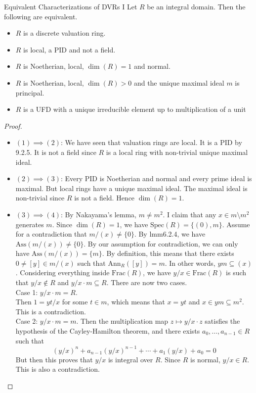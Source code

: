 \documentclass[a4paper]{article}
\begin{document}
\begin{prp}{Equivalent Characterizations of DVRs I}{} Let $R$ be an integral domain. Then the following are equivalent. 
\begin{itemize}
\item $R$ is a discrete valuation ring. 
\item $R$ is local, a PID and not a field. 
\item $R$ is Noetherian, local, $\dim(R)=1$ and normal. 
\item $R$ is Noetherian, local, $\dim(R)>0$ and the unique maximal ideal $m$ is principal. 
\item $R$ is a UFD with a unique irreducible element up to multiplication of a unit
\end{itemize} 
\begin{proof}\\
\begin{itemize}
\item $(1)\implies(2)$: We have seen that valuation rings are local. It is a PID by 9.2.5. It is not a field since $R$ is a local ring with non-trivial unique maximal ideal. 
\item $(2)\implies(3)$: Every PID is Noetherian and normal and every prime ideal is maximal. But local rings have a unique maximal ideal. The maximal ideal is non-trivial since $R$ is not a field. Hence $\dim(R)=1$. 
\item $(3)\implies(4)$: By Nakayama's lemma, $m\neq m^2$. I claim that any $x\in m\setminus m^2$ generates $m$. Since $\dim(R)=1$, we have $\text{Spec}(R)=\{(0),m\}$. Assume for a contradiction that $m/(x)\neq\{0\}$. By lmm6.2.4, we have $\text{Ass}(m/(x))\neq\{0\}$. By our assumption for contradiction, we can only have $\text{Ass}(m/(x))=\{m\}$. By definition, this means that there exists $0\neq [y]\in m/(x)$ such that $\text{Ann}_R([y])=m$. In other words, $ym\subseteq(x)$. Considering everything inside $\text{Frac}(R)$, we have $y/x\in\text{Frac}(R)$ is such that $y/x\notin R$ and $y/x\cdot m\subseteq R$. There are now two cases. \\

Case 1: $y/x\cdot m=R$. \\
Then $1=yt/x$ for some $t\in m$, which means that $x=yt$ and $x\in ym\subseteq m^2$. This is a contradiction. \\

Case 2: $y/x\cdot m=m$. Then the multiplication map $z\mapsto y/x\cdot z$ satisfies the hypothesis of the Cayley-Hamilton theorem, and there exists $a_0,\dots,a_{n-1}\in R$ such that $$(y/x)^n+a_{n-1}(y/x)^{n-1}+\cdots+a_1(y/x)+a_0=0$$ But then this proves that $y/x$ is integral over $R$. Since $R$ is normal, $y/x\in R$. This is also a contradiction. \\


\end{itemize}
\end{proof}
\end{prp}
\end{document}
